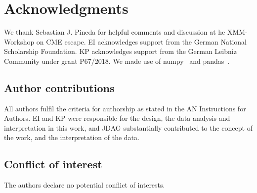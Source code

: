 \documentclass[proof]{WileyASNA-v1}
\begin{document}

\section*{Acknowledgments}
We thank Sebastian J. Pineda for helpful comments and discussion at he XMM-Workshop on CME escape.
EI acknowledges support from the German National Scholarship Foundation. KP acknowledges support from the German Leibniz Community under grant P67/2018. We made use of numpy~\citep{numpy2020} and pandas~\citep{pandas2010,pandas2020software}.



\subsection*{Author contributions}

All authors fulfil the criteria for authorship as stated in the AN Instructions for Authors. EI and KP were responsible for the design, the data analysis and interpretation in this work, and JDAG substantially contributed to the concept of the work, and the interpretation of the data.

\subsection*{Conflict of interest}
The authors declare no potential conflict of interests.


\end{document}
